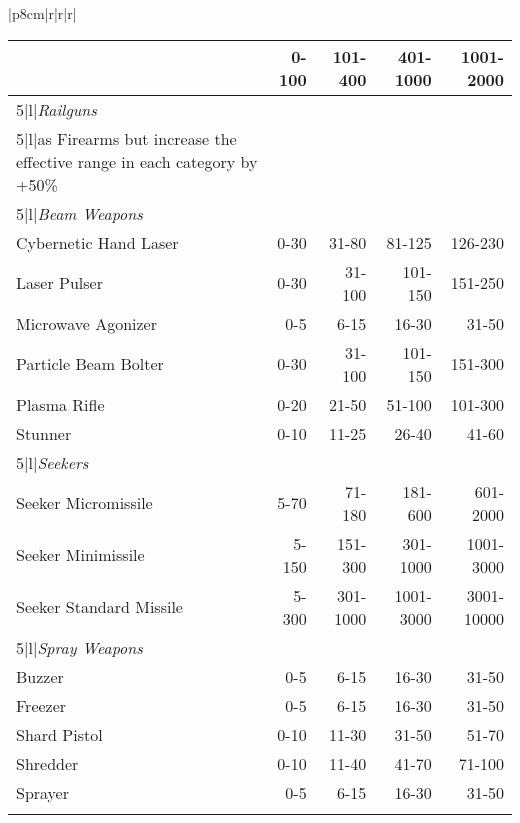 \begin{table}
\begin{tabular}{|p{8cm}|r|r|r|}
\begin{table}
\begin{tabular}{|l|r|r|r|r|}
\begin{tabularx}{\hline}{|X|r|r|r|r|}
Machine Gun	&0-100	&101-400	&401-1000	&1001-2000	\\ \hline

\hline{5}{|l|}{\emph{Railguns}}\\ \hline

\hline{5}{|l|}{as Firearms but increase the effective range in each category by +50\%} \\ \hline

\hline{5}{|l|}{\emph{Beam Weapons}} \\ \hline

Cybernetic Hand Laser	&0-30	&31-80	&81-125	&126-230 \\ \hline

Laser Pulser	&0-30	&31-100	&101-150	&151-250 \\ \hline

Microwave Agonizer	&0-5	&6-15	&16-30	&31-50 \\ \hline

Particle Beam Bolter	&0-30	&31-100	&101-150	&151-300 \\ \hline

Plasma Rifle	&0-20	&21-50	&51-100	&101-300 \\ \hline

Stunner	&0-10	&11-25	&26-40	&41-60 \\ \hline

\hline{5}{|l|}{\emph{Seekers}} \\ \hline

Seeker Micromissile	&5-70	&71-180	&181-600	&601-2000 \\ \hline

Seeker Minimissile	&5-150	&151-300	&301-1000	&1001-3000 \\ \hline

Seeker Standard Missile	&5-300	&301-1000	&1001-3000	&3001-10000 \\ \hline

\hline{5}{|l|}{\emph{Spray Weapons}} \\ \hline

Buzzer	&0-5	&6-15	&16-30	&31-50\\ \hline

Freezer	&0-5	&6-15	&16-30	&31-50\\ \hline

Shard Pistol	&0-10	&11-30	&31-50	&51-70\\ \hline

Shredder	&0-10	&11-40	&41-70	&71-100\\ \hline

Sprayer	&0-5	&6-15	&16-30	&31-50\\ \hline


\end{tabularx}
\end{tabular}
\end{table}
\end{tabular}
\end{table}
